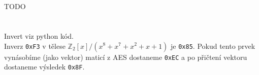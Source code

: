 \documentclass[12pt, a4paper]{article}
\begin{document}
\section{}
TODO

\section{}
Invert viz python kód.\\
Inverz \texttt{0xF3} v tělese $\mathbb{Z}_2[x]/(x^8+x^7+x^2+x+1)$ je \texttt{0x85}. Pokud tento prvek vynásobíme (jako vektor) maticí z AES dostaneme \texttt{0xEC} a po přičtení vektoru dostaneme výsledek \texttt{0x8F}.
\end{document}
